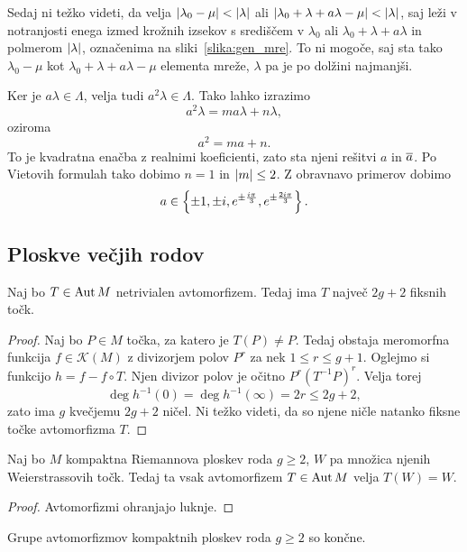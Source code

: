 Sedaj ni težko videti, da velja
$\left\lvert \lambda_0 - \mu\right\rvert < \left\lvert \lambda\right\rvert$ ali
$\left\lvert \lambda_0 + \lambda + a \lambda - \mu\right\rvert < \left\lvert \lambda\right\rvert$, saj
leži v notranjosti enega izmed krožnih izsekov s središčem v
$\lambda_0$ ali $\lambda_0 + \lambda + a \lambda$ in polmerom
$\left\lvert \lambda\right\rvert$, označenima na sliki~\ref{slika:gen_mre}. To ni
mogoče, saj sta tako $\lambda_0 - \mu$ kot
$\lambda_0 + \lambda + a \lambda - \mu$ elementa mreže, $\lambda$
pa je po dolžini najmanjši.

Ker je $a \lambda \in \Lambda$, velja tudi
$a^2 \lambda \in \Lambda$. Tako lahko izrazimo
\[
a^2 \lambda = m a \lambda + n \lambda,
\]
oziroma
\[
a^2 = ma + n.
\]
To je kvadratna enačba z realnimi koeficienti, zato sta njeni
rešitvi $a$ in $\overline{a}$. Po Vietovih formulah tako dobimo $n=1$
in $\left\lvert m\right\rvert \leq 2$. Z obravnavo primerov dobimo
\[
a \in \left\{\pm 1, \pm i,
e^{\pm \frac{i \pi}{3}}, e^{\pm \frac{2i \pi}{3}}\right\}.
\]

\subsection{Ploskve večjih rodov}

\begin{trditev}
Naj bo $T \in \operatorname{Aut} M$ netrivialen avtomorfizem. Tedaj ima $T$
največ $2g + 2$ fiksnih točk.
\end{trditev}

\begin{proof}
Naj bo $P \in M$ točka, za katero je $T(P) \ne P$. Tedaj obstaja
meromorfna funkcija $f \in \mathscr{K}(M)$ z divizorjem polov
$P^r$ za nek $1 \leq r \leq g + 1$. Oglejmo si funkcijo
$h = f - f \circ T$. Njen divizor polov je očitno
$P^r (T^{-1}P)^r$. Velja torej
\[
\deg h^{-1}(0) = \deg h^{-1}(\infty) = 2r \leq 2g + 2,
\]
zato ima $g$ kvečjemu $2g + 2$ ničel. Ni težko videti, da so njene
ničle natanko fiksne točke avtomorfizma $T$.
\end{proof}

\begin{lema}
Naj bo $M$ kompaktna Riemannova ploskev roda $g \geq 2$, $W$ pa
množica njenih Weierstrassovih točk. Tedaj ta vsak avtomorfizem
$T \in \operatorname{Aut} M$ velja $T(W) = W$.
\end{lema}

\begin{proof}
Avtomorfizmi ohranjajo luknje.
\end{proof}

\begin{izrek}[Schwarz]
Grupe avtomorfizmov kompaktnih ploskev roda $g \geq 2$ so končne.
\end{izrek}

